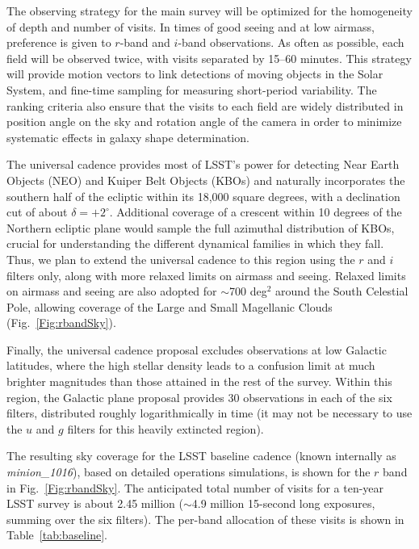 The observing strategy for the main survey will be optimized for the homogeneity
of depth and number of visits. In times of good seeing and at low airmass, preference
is given to $r$-band and $i$-band observations. As often as possible, each field will be
observed twice, with visits separated by 15--60 minutes. This strategy will provide motion
vectors to link detections of moving objects in the Solar System, and fine-time sampling
for measuring short-period variability. The ranking criteria also ensure that the
visits to each field are widely distributed in position angle on the sky and
rotation angle of the camera in order to minimize systematic effects in galaxy shape
determination.

The universal cadence provides most of LSST's power for detecting Near Earth
Objects (NEO) and Kuiper Belt Objects (KBOs) and naturally
incorporates the southern half of the ecliptic
within its 18,000 square degrees, with a declination cut of about
$\delta = +2^\circ$.  Additional coverage of a crescent within 10
degrees of the Northern
ecliptic plane would sample the full azimuthal distribution of KBOs,
crucial for understanding the different dynamical families in which
they fall.
Thus, we plan to extend
 the universal cadence to this region using the
$r$ and $i$ filters only, along
with more relaxed limits on airmass and seeing. Relaxed limits on airmass and
seeing are also adopted for $\sim$700 deg$^2$ around the South Celestial
Pole, allowing coverage of the Large and Small Magellanic Clouds
(Fig.~\ref{Fig:rbandSky}).

Finally, the universal cadence proposal excludes observations at low
Galactic latitudes, where the high stellar
density leads to a confusion limit at much brighter magnitudes than those
attained in the rest of the survey. Within this region, the Galactic plane
proposal provides 30 observations in each of the six filters, distributed
roughly logarithmically in time (it may not be necessary to use the
$u$ and $g$ filters for this heavily extincted region).

The resulting sky coverage for the LSST baseline cadence (known internally as
{\it minion\_1016}), based on detailed operations simulations, is shown for the
$r$ band in Fig.~\ref{Fig:rbandSky}. The anticipated total number of visits
for a ten-year LSST survey  is about 2.45 million ($\sim$4.9 million 15-second long
exposures, summing over the six filters). The per-band allocation of
these visits is shown in Table~\ref{tab:baseline}.

